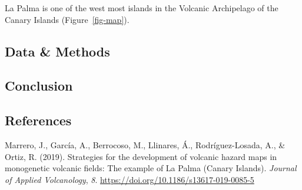 \documentclass[
]{agujournal2019}
\newlength{\cslhangindent}
\newenvironment{CSLReferences}[2] %
 {\begin{list}{}{%
  \setlength{\itemindent}{0pt}
  \setlength{\leftmargin}{0pt}
  \setlength{\parsep}{0pt}
  \ifodd #1
   \setlength{\leftmargin}{\cslhangindent}
   \setlength{\itemindent}{-1\cslhangindent}
  \fi
  \setlength{\itemsep}{#2\baselineskip}}}
 {\end{list}}
\begin{document}
La Palma is one of the west most islands in the Volcanic Archipelago of
the Canary Islands (Figure~\ref{fig-map}).

\subsection{Data \& Methods}\label{sec-data-methods}

\subsection{Conclusion}\label{conclusion}

\subsection*{References}\label{references}

\label{refs}
\begin{CSLReferences}{1}{0}
\vspace{1em}

Marrero, J., García, A., Berrocoso, M., Llinares, Á., Rodríguez-Losada,
A., \& Ortiz, R. (2019). Strategies for the development of volcanic
hazard maps in monogenetic volcanic fields: The example of {La} {Palma}
({Canary} {Islands}). \emph{Journal of Applied Volcanology}, \emph{8}.
\url{https://doi.org/10.1186/s13617-019-0085-5}

\end{CSLReferences}
\end{document}
